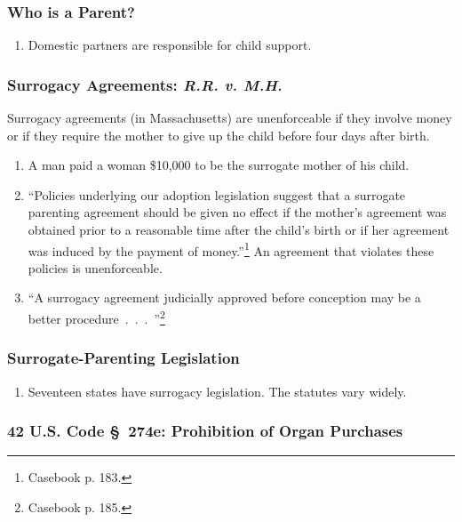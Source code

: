 \subsubsection{Who is a Parent?}

\begin{enumerate}
    \item Domestic partners are responsible for child support.
\end{enumerate}

\subsubsection{Surrogacy Agreements: \emph{R.R. v. M.H.}}

Surrogacy agreements (in Massachusetts) are unenforceable if they involve 
money or if they require the mother to give up the child before four days 
after birth.

\begin{enumerate}
    \item A man paid a woman \$10,000 to be the surrogate mother of his child.
    \item ``Policies underlying our adoption legislation suggest that a 
    surrogate parenting agreement should be given no effect if the mother's 
    agreement was obtained prior to a reasonable time after the child's birth 
    or if her agreement was induced by the payment of 
    money.''\footnote{Casebook p. 183.} An agreement that violates these 
    policies is unenforceable.
    \item ``A surrogacy agreement judicially approved before conception may be 
    a better procedure~.~.~.~''\footnote{Casebook p. 185.}
\end{enumerate}

\subsubsection{Surrogate-Parenting Legislation}

\begin{enumerate}
    \item Seventeen states have surrogacy legislation. The statutes vary 
    widely.
\end{enumerate}

\subsubsection{42 U.S. Code \S\ 274e: Prohibition of Organ Purchases}

